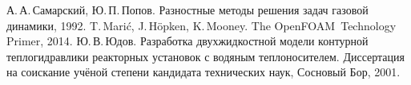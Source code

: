 
\label{sec:bibliography}
\begin{thebibliography}{99}
А.\,А.\,Самарский, Ю.\,П.\,Попов. Разностные методы решения задач газовой динамики, 1992.
T.\,Mari\'{c}, J.\,H\"{o}pken, K.\,Mooney. The OpenFOAM\ Technology Primer, 2014.
Ю.\,В.\,Юдов. Разработка двухжидкостной модели контурной теплогидравлики реакторных установок с водяным теплоносителем. Диссертация на соискание учёной степени кандидата технических наук, Сосновый Бор, 2001.  
\end{thebibliography}

\resetCountersAfterBib